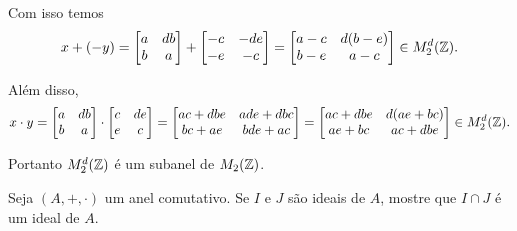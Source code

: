 \documentclass[12pt]{exam}
\begin{document}
    Com isso temos
    \begin{align*}
        x + (-y) = \begin{bmatrix}
            a & db\\b & a
        \end{bmatrix} + \begin{bmatrix}
        -c & -de\\-e & -c
        \end{bmatrix} = \begin{bmatrix}
        a - c & d(b - e)\\b - e & a - c
        \end{bmatrix} \in M_2^d(\mathbb{Z}).
    \end{align*}

    Além disso,
    \begin{align*}
        x \cdot y = \begin{bmatrix}
            a & db\\b & a
        \end{bmatrix} \cdot \begin{bmatrix}
            c & de\\e & c
        \end{bmatrix} = \begin{bmatrix}
            ac + dbe & ade + dbc\\bc + ae & bde + ac
        \end{bmatrix} = \begin{bmatrix}
            ac + dbe & d(ae + bc)\\ae + bc & ac + dbe
        \end{bmatrix} \in M_2^d(\mathbb{Z}).
    \end{align*}

    Portanto $M_2^d(\mathbb{Z})$ é um subanel de $M_2(\mathbb{Z})$.
    \vspace{.4cm}

    \questao Seja $(A, +, \cdot)$ um anel comutativo. Se $I$ e $J$ são ideais de $A$, mostre que $I \cap J$ é um ideal de $A$.
\vspace{1cm}
\end{document}
